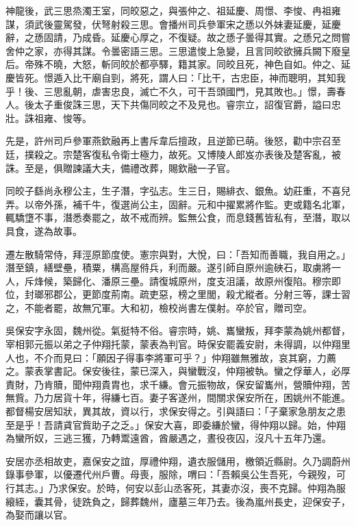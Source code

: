 \begin{pinyinscope}
 神龍後，武三思烝濁王室，同皎惡之，與張仲之、祖延慶、周憬、李悛、冉祖雍謀，須武後靈駕發，伏弩射殺三思。會播州司兵參軍宋之愻以外妹妻延慶，延慶辭，之愻固請，乃成昏。延慶心厚之，不復疑。故之愻子曇得其實。之愻兄之問嘗舍仲之家，亦得其謀。令曇密語三思。三思遣悛上急變，且言同皎欲擁兵闕下廢皇后。帝殊不曉，大怒，斬同皎於都亭驛，籍其家。同皎且死，神色自如。仲之、延慶皆死。憬遁入比干廟自剄，將死，謂人曰：「比干，古忠臣，神而聰明，其知我乎！後、三思亂朝，虐害忠良，滅亡不久，可干吾頭國門，見其敗也。」憬，壽春人。後太子重俊誅三思，天下共傷同皎之不及見也。睿宗立，詔復官爵，謚曰忠壯。誅祖雍、悛等。



 先是，許州司戶參軍燕欽融再上書斥韋后擅政，且逆節已萌。後怒，勸中宗召至廷，撲殺之。宗楚客復私令衛士極力，故死。又博陵人郎岌亦表後及楚客亂，被誅。至是，俱贈諫議大夫，備禮改葬，賜欽融一子官。



 同皎子繇尚永穆公主，生子潛，字弘志。生三日，賜緋衣、銀魚。幼莊重，不喜兒弄。以帝外孫，補千牛，復選尚公主，固辭。元和中擢累將作監。吏或籍名北軍，輒驕墯不事，潛悉奏罷之，故不戒而辨。監無公食，而息錢舊皆私有，至潛，取以具食，遂為故事。



 遷左散騎常侍，拜涇原節度使。憲宗與對，大悅，曰：「吾知而善職，我自用之。」潛至鎮，繕壁壘，積粟，構高屋偫兵，利而嚴。遂引師自原州逾硤石，取虜將一人，斥烽候，築歸化、潘原三壘。請復城原州，度支沮議，故原州復陷。穆宗即位，封瑯邪郡公，更節度荊南。疏吏惡，榜之里閭，殺尤縱者。分射三等，課士習之，不能者罷，故無冗軍。大和初，檢校尚書左僕射。卒於官，贈司空。



 吳保安字永固，魏州從。氣挺特不俗。睿宗時，姚、巂蠻叛，拜李蒙為姚州都督，宰相郭元振以弟之子仲翔托蒙，蒙表為判官。時保安罷義安尉，未得調，以仲翔里人也，不介而見曰：「願因子得事李將軍可乎？」仲翔雖無雅故，哀其窮，力薦之。蒙表掌書記。保安後往，蒙已深入，與蠻戰沒，仲翔被執。蠻之俘華人，必厚責財，乃肯贖，聞仲翔貴胄也，求千縑。會元振物故，保安留巂州，營贖仲翔，苦無貲。乃力居貨十年，得縑七百。妻子客遂州，間關求保安所在，困姚州不能進。都督楊安居知狀，異其故，資以行，求保安得之。引與語曰：「子棄家急朋友之患至是乎！吾請貣官貲助子之乏。」保安大喜，即委縑於蠻，得仲翔以歸。始，仲翔為蠻所奴，三逃三獲，乃轉鬻遠酋，酋嚴遇之，晝役夜囚，沒凡十五年乃還。



 安居亦丞相故吏，嘉保安之誼，厚禮仲翔，遺衣服儲用，檄領近縣尉。久乃調蔚州錄事參軍，以優遷代州戶曹。母喪，服除，喟曰：「吾賴吳公生吾死，今親歿，可行其志。」乃求保安。於時，何安以彭山丞客死，其妻亦沒，喪不克歸。仲翔為服縗絰，囊其骨，徒跣負之，歸葬魏州，廬墓三年乃去。後為嵐州長史，迎保安子，為娶而讓以官。




\end{pinyinscope}
